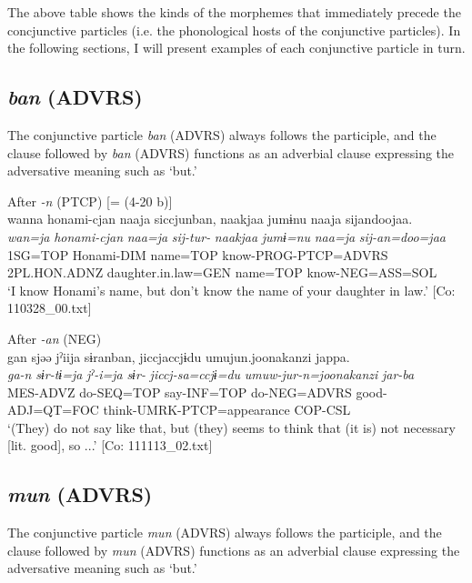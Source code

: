 The above table shows the kinds of the morphemes that immediately precede the concjunctive particles (i.e. the phonological hosts of the conjunctive particles). In the following sections, I will present examples of each conjunctive particle in turn.

\subsection{\textit{ban} (ADVRS)}\label{sec:10.2.1}

The conjunctive particle \textit{ban} (ADVRS) always follows the participle, and the clause followed by \textit{ban} (ADVRS) functions as an adverbial clause expressing the adversative meaning such as ‘but.’

\ea\label{ex:10.30} 
\ea After \textit{-n} (PTCP) [= (4-20 b)]\\
      \glll    wanna  honami-{\textbar}cjan{\textbar}  naaja  siccjunban, naakjaa  jumɨnu  naaja  sijandoojaa.\\
    \textit{wan=ja}  \textit{honami-cjan}  \textit{naa=ja}  \textit{sij-tur-}  \textit{naakjaa}  \textit{jumɨ=nu}  \textit{naa=ja}  \textit{sij-an=doo=jaa}\\
    1SG=TOP  Honami-DIM  name=TOP  know-PROG-PTCP=ADVRS  2PL.HON.ADNZ  daughter.in.law=GEN  name=TOP  know-NEG=ASS=SOL\\
\glt     ‘I know Honami’s name, but don’t know the name of your daughter in law.’  [Co: 110328\_00.txt]

  \ex After \textit{-an} (NEG)\\
      \glll    gan  sjəə  jˀiija  sɨranban,  jiccjaccjɨdu  umujun.{\textbar}joonakanzi{\textbar}  jappa.\\
    \textit{ga-n}  \textit{sɨr-tɨ=ja}  \textit{jˀ-i=ja}  \textit{sɨr-}     \textit{jiccj-sa=ccjɨ=du}  \textit{umuw-jur-n=joonakanzi}  \textit{jar-ba}\\
    MES-ADVZ  do-SEQ=TOP  say-INF=TOP  do-NEG=ADVRS  good-ADJ=QT=FOC  think-UMRK-PTCP=appearance  COP-CSL\\
\glt     ‘(They) do not say like that, but (they) seems to think that (it is) not necessary [lit. good], so ...’  [Co: 111113\_02.txt]
\z
\z

\subsection{\textit{mun} (ADVRS)}\label{sec:10.2.2}

The conjunctive particle \textit{mun} (ADVRS) always follows the participle, and the clause followed by \textit{mun} (ADVRS) functions as an adverbial clause expressing the adversative meaning such as ‘but.’

